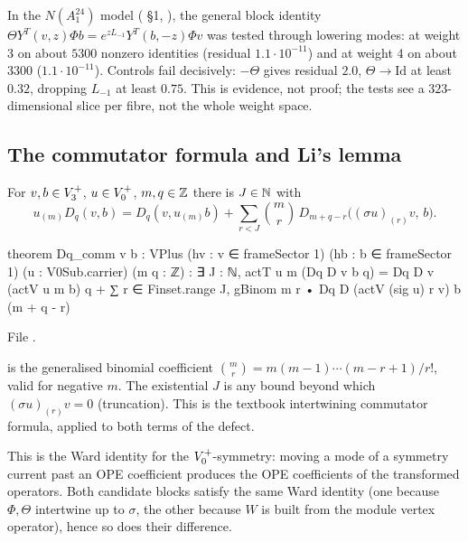\begin{warning}[title={Evidence: Numerical evidence at weights 3 and 4}]
In the $N(A_1^{24})$ model ( \S1, ),
the general block identity $\Theta Y^T(v,z)\Phi b=e^{zL_{-1}}Y^T(b,-z)\Phi v$ was tested through
lowering modes: at weight 3 on about $5300$ nonzero identities (residual $1.1\cdot10^{-11}$) and at
weight 4 on about $3300$ ($1.1\cdot10^{-11}$).  Controls fail decisively: $-\Theta$ gives residual $2.0$,
$\Theta\to\mathrm{Id}$ at least $0.32$, dropping $L_{-1}$ at least $0.75$.  This is evidence, not proof;
the tests see a $323$-dimensional slice per fibre, not the whole weight space.
\end{warning}

\subsection{The commutator formula and Li's lemma}

\begin{proposition}\label{ch14:prop:Dqcomm}
For $v,b\in V_3^{+}$, $u\in V_0^{+}$, $m,q\in{\mathbb{Z}}$ there is $J\in{\mathbb{N}}$ with
\begin{equation*}
  u_{(m)}D_q(v,b)=D_q(v,u_{(m)}b)+\sum_{r<J}\binom{m}{r}\,D_{m+q-r}\bigl((\sigma u)_{(r)}v,\,b\bigr).
\end{equation*}
\end{proposition}
\begin{leancode}
theorem Dq_comm {v b : VPlus} (hv : v ∈ frameSector 1) (hb : b ∈ frameSector 1)
    (u : V0Sub.carrier) (m q : ℤ) :
    ∃ J : ℕ, actT u m (Dq D v b q) = Dq D v (actV u m b) q
      + ∑ r ∈ Finset.range J, gBinom m r • Dq D (actV (sig u) r v) b (m + q - r)
\end{leancode}
File .

\begin{dictionary}
 is the generalised binomial coefficient $\binom mr=m(m-1)\cdots(m-r+1)/r!$, valid for
negative $m$.  The existential $J$ is any bound beyond which $(\sigma u)_{(r)}v=0$ (truncation).  This is
the textbook intertwining commutator formula, applied to both terms of the defect.
\end{dictionary}

\begin{physics}
This is the Ward identity for the $V_0^{+}$-symmetry: moving a mode of a symmetry current past an
OPE coefficient produces the OPE coefficients of the transformed operators.  Both candidate blocks
satisfy the same Ward identity (one because $\Phi,\Theta$ intertwine up to $\sigma$, the other because
$W$ is built from the module vertex operator), hence so does their difference.
\end{physics}

